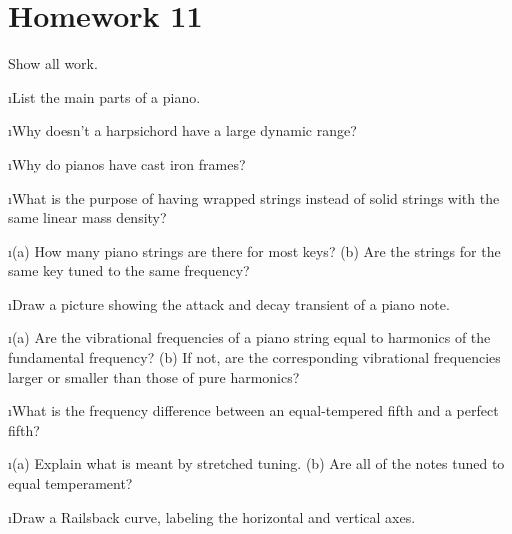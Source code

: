 \section{Homework 11}

\noindent
Show all work.

\ben

\i List the main parts of a piano.

\i Why doesn't a harpsichord have a large dynamic range?

\i Why do pianos have cast iron frames?

\i What is the purpose of having wrapped strings instead of
solid strings with the same linear mass density?

\i (a) How many piano strings are there for most keys?
(b) Are the strings for the same key tuned to the same frequency?

\i Draw a picture showing the attack and decay transient
of a piano note.

\i (a) Are the vibrational frequencies of a piano string
equal to harmonics of the fundamental frequency?
(b) If not, are the corresponding vibrational frequencies 
larger or smaller than those of pure harmonics?

\i What is the frequency difference between an equal-tempered
fifth and a perfect fifth?

\i (a) Explain what is meant by stretched tuning.
(b) Are all of the notes tuned to equal temperament?

\i Draw a Railsback curve, labeling the horizontal and
vertical axes.

\een

